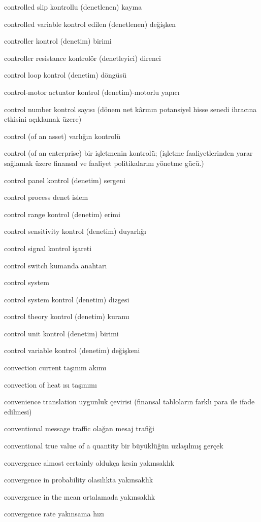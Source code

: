\documentclass[12pt,fleqn]{article}\usepackage{../../common}
\begin{document}
controlled slip kontrollu (denetlenen) kayma

controlled variable kontrol edilen (denetlenen) değişken

controller kontrol (denetim) birimi

controller resistance kontrolör (denetleyici) direnci

control loop kontrol (denetim) döngüsü

control-motor actuator kontrol (denetim)-motorlu yapıcı

control number kontrol sayısı (dönem net kârının potansiyel hisse senedi ihracına etkisini açıklamak üzere)

control (of an asset) varlığın kontrolü

control (of an enterprise) bir işletmenin kontrolü; (işletme faaliyetlerinden yarar sağlamak üzere finansal ve faaliyet politikalarını yönetme gücü.)

control panel kontrol (denetim) sergeni

control process denet islem

control range kontrol (denetim) erimi

control sensitivity kontrol (denetim) duyarlığı

control signal kontrol işareti

control switch kumanda anahtarı

control system

control system kontrol (denetim) dizgesi

control theory kontrol (denetim) kuramı

control unit kontrol (denetim) birimi

control variable kontrol (denetim) değişkeni

convection current taşınım akımı

convection of heat ısı taşınımı

convenience translation uygunluk çevirisi (finansal tabloların farklı para ile ifade edilmesi)

conventional message traffic olağan mesaj trafiği

conventional true value of a quantity bir büyüklüğün uzlaşılmış gerçek

convergence almost certainly oldukça kesin yakınsaklık

convergence in probability olasılıkta yakınsaklık

convergence in the mean ortalamada yakınsaklık

convergence rate yakınsama hızı
\end{document}
